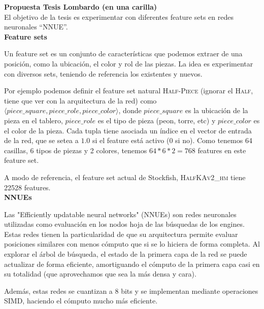 
\textbf{\large Propuesta Tesis Lombardo (en una carilla)} \\

El objetivo de la tesis es experimentar con diferentes feature sets en redes neuronales ``NNUE''. \\

\textbf{Feature sets}

Un feature set es un conjunto de características que podemos extraer de una posición, como la ubicación, el color y rol de las piezas. La idea es experimentar con diversos sets, teniendo de referencia los existentes y nuevos.

Por ejemplo podemos definir el feature set natural \textsc{Half-Piece} (ignorar el \textsc{Half}, tiene que ver con la arquitectura de la red) como $\langle piece\_square, piece\_role, piece\_color \rangle$, donde $piece\_square$ es la ubicación de la pieza en el tablero, $piece\_role$ es el tipo de pieza (peon, torre, etc) y $piece\_color$ es el color de la pieza. Cada tupla tiene asociada un índice en el vector de entrada de la red, que se setea a $1.0$ si el feature está activo (0 si no). Como tenemos 64 casillas, 6 tipos de piezas y 2 colores, tenemos $64*6*2=768$ features en este feature set.

A modo de referencia, el feature set actual de Stockfish, \textsc{HalfKAv2\_hm} tiene 22528 features. \\

\textbf{NNUEs}

Las "Efficiently updatable neural networks" (NNUEs) son redes neuronales utilizadas como evaluación en los nodos hoja de las búsquedas de los engines. Estas redes tienen la particularidad de que su arquitectura permite evaluar posiciones similares con menos cómputo que si se lo hiciera de forma completa. Al explorar el árbol de búsqueda, el estado de la primera capa de la red se puede actualizar de forma eficiente, amortiguando el cómputo de la primera capa casi en su totalidad (que aprovechamos que sea la más densa y cara).

Además, estas redes se cuantizan a 8 bits y se implementan mediante operaciones SIMD, haciendo el cómputo mucho más eficiente. \\

